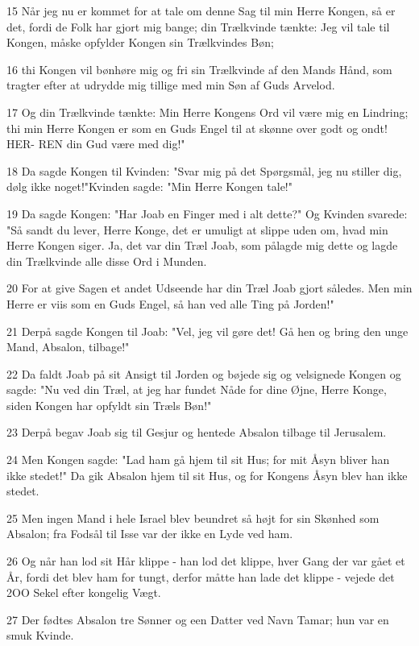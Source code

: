 \par 15 Når jeg nu er kommet for at tale om denne Sag til min Herre Kongen, så er det, fordi de Folk har gjort mig bange; din Trælkvinde tænkte: Jeg vil tale til Kongen, måske opfylder Kongen sin Trælkvindes Bøn;
\par 16 thi Kongen vil bønhøre mig og fri sin Trælkvinde af den Mands Hånd, som tragter efter at udrydde mig tillige med min Søn af Guds Arvelod.
\par 17 Og din Trælkvinde tænkte: Min Herre Kongens Ord vil være mig en Lindring; thi min Herre Kongen er som en Guds Engel til at skønne over godt og ondt! HER- REN din Gud være med dig!"
\par 18 Da sagde Kongen til Kvinden: "Svar mig på det Spørgsmål, jeg nu stiller dig, dølg ikke noget!"Kvinden sagde: "Min Herre Kongen tale!"
\par 19 Da sagde Kongen: "Har Joab en Finger med i alt dette?" Og Kvinden svarede: "Så sandt du lever, Herre Konge, det er umuligt at slippe uden om, hvad min Herre Kongen siger. Ja, det var din Træl Joab, som pålagde mig dette og lagde din Trælkvinde alle disse Ord i Munden.
\par 20 For at give Sagen et andet Udseende har din Træl Joab gjort således. Men min Herre er viis som en Guds Engel, så han ved alle Ting på Jorden!"
\par 21 Derpå sagde Kongen til Joab: "Vel, jeg vil gøre det! Gå hen og bring den unge Mand, Absalon, tilbage!"
\par 22 Da faldt Joab på sit Ansigt til Jorden og bøjede sig og velsignede Kongen og sagde: "Nu ved din Træl, at jeg har fundet Nåde for dine Øjne, Herre Konge, siden Kongen har opfyldt sin Træls Bøn!"
\par 23 Derpå begav Joab sig til Gesjur og hentede Absalon tilbage til Jerusalem.
\par 24 Men Kongen sagde: "Lad ham gå hjem til sit Hus; for mit Åsyn bliver han ikke stedet!" Da gik Absalon hjem til sit Hus, og for Kongens Åsyn blev han ikke stedet.
\par 25 Men ingen Mand i hele Israel blev beundret så højt for sin Skønhed som Absalon; fra Fodsål til Isse var der ikke en Lyde ved ham.
\par 26 Og når han lod sit Hår klippe - han lod det klippe, hver Gang der var gået et År, fordi det blev ham for tungt, derfor måtte han lade det klippe - vejede det 2OO Sekel efter kongelig Vægt.
\par 27 Der fødtes Absalon tre Sønner og een Datter ved Navn Tamar; hun var en smuk Kvinde.
